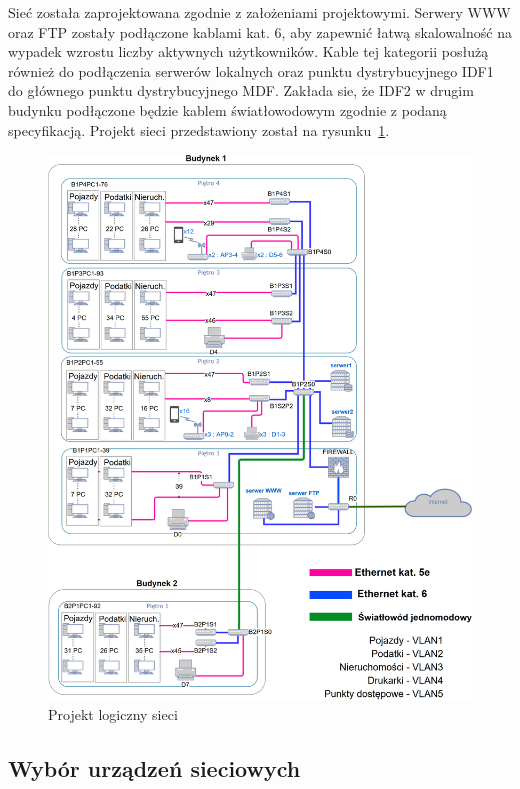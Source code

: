 \documentclass[12pt,a4paper]{article}
\begin{document}
	    Sieć została zaprojektowana zgodnie z założeniami projektowymi.
	    Serwery WWW oraz FTP zostały podłączone kablami kat. 6, aby zapewnić łatwą skalowalność na wypadek wzrostu liczby aktywnych użytkowników.
	    Kable tej kategorii posłużą również do podłączenia serwerów lokalnych oraz punktu dystrybucyjnego IDF1 do głównego punktu dystrybucyjnego MDF.
	    Zakłada sie, że IDF2 w drugim budynku podłączone będzie kablem światłowodowym zgodnie z podaną specyfikacją.
	    Projekt sieci przedstawiony został na rysunku~\ref{fig:projekt}.
	\begin{figure}[H]
	    \centering
	    \includegraphics[width = \textwidth]{obrazki/diag.png}
	    \caption{Projekt logiczny sieci}
	    \label{fig:projekt}
	\end{figure}
	    
	\subsection{Wybór urządzeń sieciowych}
	
\end{document}
